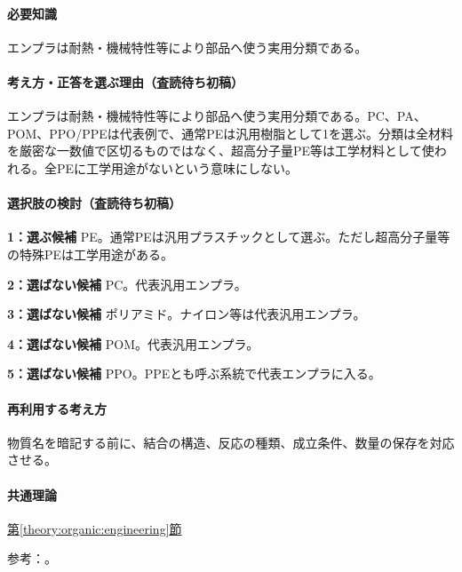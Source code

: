 \paragraph{必要知識} エンプラは耐熱・機械特性等により部品へ使う実用分類である。

\paragraph{考え方・正答を選ぶ理由（査読待ち初稿）} エンプラは耐熱・機械特性等により部品へ使う実用分類である。PC、PA、POM、PPO/PPEは代表例で、通常PEは汎用樹脂として1を選ぶ。分類は全材料を厳密な一数値で区切るものではなく、超高分子量PE等は工学材料として使われる。全PEに工学用途がないという意味にしない。

\paragraph{選択肢の検討（査読待ち初稿）}\mbox{}\par

\noindent\textbf{1：選ぶ候補} PE。通常PEは汎用プラスチックとして選ぶ。ただし超高分子量等の特殊PEは工学用途がある。\par

\noindent\textbf{2：選ばない候補} PC。代表汎用エンプラ。\par

\noindent\textbf{3：選ばない候補} ポリアミド。ナイロン等は代表汎用エンプラ。\par

\noindent\textbf{4：選ばない候補} POM。代表汎用エンプラ。\par

\noindent\textbf{5：選ばない候補} PPO。PPEとも呼ぶ系統で代表エンプラに入る。\par

\paragraph{再利用する考え方} 物質名を暗記する前に、結合の構造、反応の種類、成立条件、数量の保存を対応させる。

\paragraph{共通理論} \hyperref[theory:organic:engineering]{第\ref*{theory:organic:engineering}節}

\par 参考：\cite{organic_enpla}。

